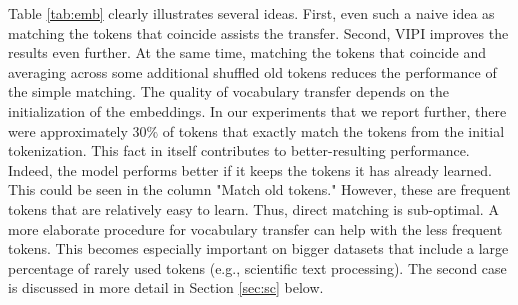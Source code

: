 \documentclass[review]{elsarticle}
\begin{document}
Table \ref{tab:emb} clearly illustrates several ideas. First, even such a naive idea as matching the tokens that coincide assists the transfer. Second, VIPI improves the results even further. At the same time, matching the tokens that coincide and averaging across some additional shuffled old tokens reduces the performance of the simple matching. The quality of vocabulary transfer depends on the initialization of the embeddings. In our experiments that we report further, there were approximately $30\%$ of tokens that exactly match the tokens from the initial tokenization. This fact in itself contributes to better-resulting performance. Indeed, the model performs better if it keeps the tokens it has already learned. This could be seen in the column "Match old tokens." However, these are frequent tokens that are relatively easy to learn. Thus, direct matching is sub-optimal. A more elaborate procedure for vocabulary transfer can help with the less frequent tokens. This becomes especially important on bigger datasets that include a large percentage of rarely used tokens (e.g., scientific text processing). The second case is discussed in more detail in Section \ref{sec:sc} below.
\end{document}
